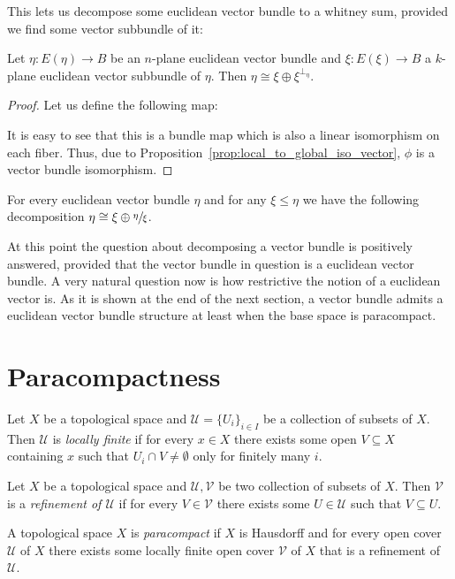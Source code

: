This lets us decompose some euclidean vector bundle to a whitney sum, provided we find some vector subbundle of it:
\begin{proposition}\label{prop:vb_decomposition} Let $\eta:E(\eta)\to B$ be an $n$-plane euclidean vector bundle and $\xi:E(\xi)\to B$ a $k$-plane euclidean vector subbundle of $\eta$. Then $\eta\cong\xi\oplus\xi^{\perp_{\eta}}$.
\end{proposition}
\begin{proof} Let us define the following map:
\begin{center}
\end{center}
It is easy to see that this is a bundle map which is also a linear isomorphism on each fiber. Thus, due to Proposition~\ref{prop:local_to_global_iso_vector}, $\phi$ is a vector bundle isomorphism.
\end{proof}
\begin{remark}\label{rem:vb_decomposition} For every euclidean vector bundle $\eta$ and for any $\xi\leq\eta$ we have the following decomposition $\eta\cong\xi\oplus\sfrac{\eta}{\xi}$.
\end{remark}

At this point the question about decomposing a vector bundle is positively answered, provided that the vector bundle in question is a euclidean vector bundle. A very natural question now is how restrictive the notion of a euclidean vector is. As it is shown at the end of the next section, a vector bundle admits a euclidean vector bundle structure at least when the base space is paracompact.

\section{Paracompactness}
\begin{definition} Let $X$ be a topological space and $\mathcal{U}=\{U_i\}_{i\in I}$ be a collection of subsets of $X$. Then $\mathcal{U}$ is \emph{locally finite} if for every $x\in X$ there exists some open $V\subseteq X$ containing $x$ such that $U_i\cap V\neq\emptyset$ only for finitely many $i$.
\end{definition}
\begin{definition} Let $X$ be a topological space and $\mathcal{U},\mathcal{V}$ be two collection of subsets of $X$. Then $\mathcal{V}$ is a \emph{refinement of $\mathcal{U}$} if for every $V\in\mathcal{V}$ there exists some $U\in\mathcal{U}$ such that $V\subseteq U$.
\end{definition}
\begin{definition} A topological space $X$ is \emph{paracompact} if $X$ is Hausdorff and for every open cover $\mathcal{U}$ of $X$ there exists some locally finite open cover $\mathcal{V}$ of $X$ that is a refinement of $\mathcal{U}$.
\end{definition}

